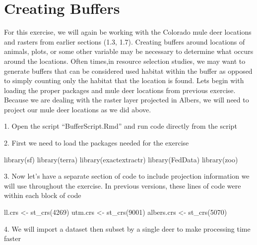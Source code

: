 \documentclass[
  letterpaper,
]{book}
\newenvironment{Shaded}{\begin{snugshade}}{\end{snugshade}}
\newcommand{\DecValTok}[1]{\textcolor[rgb]{0.68,0.00,0.00}{#1}}
\newcommand{\FunctionTok}[1]{\textcolor[rgb]{0.28,0.35,0.67}{#1}}
\newcommand{\NormalTok}[1]{\textcolor[rgb]{0.00,0.23,0.31}{#1}}
\newcommand{\OtherTok}[1]{\textcolor[rgb]{0.00,0.23,0.31}{#1}}
\begin{document}
\hypertarget{creating-buffers}{%
\chapter{Creating Buffers}\label{creating-buffers}}

For this exercise, we will again be working with the Colorado mule deer
locations and rasters from earlier sections (1.3, 1.7). Creating buffers
around locations of animals, plots, or some other variable may be
necessary to determine what occurs around the locations. Often times,in
resource selection studies, we may want to generate buffers that can be
considered used habitat within the buffer as opposed to simply counting
only the habitat that the location is found. Lets begin with loading the
proper packages and mule deer locations from previous exercise. Because
we are dealing with the raster layer projected in Albers, we will need
to project our mule deer locations as we did above.

1. Open the script ``BufferScript.Rmd'' and run code directly from the
script

2. First we need to load the packages needed for the exercise

\begin{Shaded}
\begin{Highlighting}[]
\FunctionTok{library}\NormalTok{(sf)}
\FunctionTok{library}\NormalTok{(terra)}
\FunctionTok{library}\NormalTok{(exactextractr)}
\FunctionTok{library}\NormalTok{(FedData)}
\FunctionTok{library}\NormalTok{(zoo)}
\end{Highlighting}
\end{Shaded}

3. Now let's have a separate section of code to include projection
information we will use throughout the exercise. In previous versions,
these lines of code were within each block of code

\begin{Shaded}
\begin{Highlighting}[]
\NormalTok{ll.crs }\OtherTok{\textless{}{-}} \FunctionTok{st\_crs}\NormalTok{(}\DecValTok{4269}\NormalTok{)}
\NormalTok{utm.crs }\OtherTok{\textless{}{-}} \FunctionTok{st\_crs}\NormalTok{(}\DecValTok{9001}\NormalTok{)}
\NormalTok{albers.crs }\OtherTok{\textless{}{-}} \FunctionTok{st\_crs}\NormalTok{(}\DecValTok{5070}\NormalTok{)}
\end{Highlighting}
\end{Shaded}

4. We will import a dataset then subset by a single deer to make
processing time faster
\end{document}
